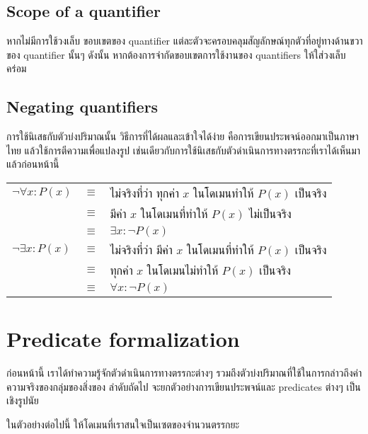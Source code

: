 \subsection{Scope of a quantifier}
หากไม่มีการใช้วงเล็บ ขอบเขตของ quantifier แต่ละตัวจะครอบคลุมสัญลักษณ์ทุกตัวที่อยู่ทางด้านขวาของ quantifier นั้นๆ \enskip ดังนั้น หากต้องการจำกัดขอบเขตการใช้งานของ quantifiers ให้ใส่วงเล็บคร่อม

\subsection{Negating quantifiers}
การใช้นิเสธกับตัวบ่งปริมาณนั้น วิธีการที่ได้ผลและเข้าใจได้ง่าย คือการเขียนประพจน์ออกมาเป็นภาษาไทย แล้วใช้การตีความเพื่อแปลงรูป เช่นเดียวกับการใช้นิเสธกับตัวดำเนินการทางตรรกะที่เราได้เห็นมาแล้วก่อนหน้านี้

\begin{tabular}{lcl}
$\neg\forall x: P(x)$ & $\equiv$ & ไม่จริงที่ว่า ทุกค่า $x$ ในโดเมนทำให้ $P(x)$ เป็นจริง \\
& $\equiv$ & มีค่า $x$ ในโดเมนที่ทำให้ $P(x)$ ไม่เป็นจริง \\
& $\equiv$ & $\exists x: \neg P(x)$ \\
%
$\neg\exists x: P(x)$ & $\equiv$ & ไม่จริงที่ว่า มีค่า $x$ ในโดเมนที่ทำให้ $P(x)$ เป็นจริง \\
& $\equiv$ & ทุกค่า $x$ ในโดเมนไม่ทำให้ $P(x)$ เป็นจริง \\
& $\equiv$ & $\forall x: \neg P(x)$
\end{tabular}

\section{Predicate formalization}
ก่อนหน้านี้ เราได้ทำความรู้จักตัวดำเนินการทางตรรกะต่างๆ รวมถึงตัวบ่งปริมาณที่ใช้ในการกล่าวถึงค่าความจริงของกลุ่มของสิ่งของ \enskip ลำดับถัดไป จะยกตัวอย่างการเขียนประพจน์และ predicates ต่างๆ เป็นเชิงรูปนัย

ในตัวอย่างต่อไปนี้ ให้โดเมนที่เราสนใจเป็นเซตของจำนวนตรรกยะ

